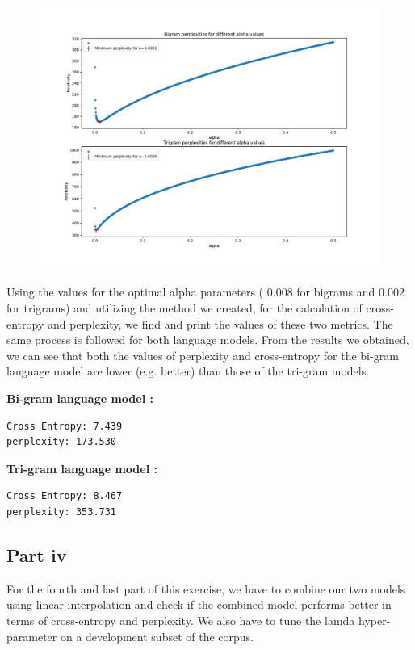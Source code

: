 \documentclass[11pt]{article}
\begin{document}
\begin{figure}[h]
\includegraphics[width=\columnwidth]{Alpha_Tuning.pdf}
\end{figure}

\newpage

Using the values for the optimal alpha parameters ( \textit{$0.008$} for bigrams and \textit{$0.002$} for trigrams) and utilizing the method we created, for the calculation of cross-entropy and perplexity, we find and print the values of these two metrics. The same process is followed for both language models. From the results we obtained, we can see that both the values of perplexity and cross-entropy for the bi-gram language model are lower (e.g. better) than those of the tri-gram models.

\bigskip
\textbf{Bi-gram language model :}
\begin{verbatim}
Cross Entropy: 7.439
perplexity: 173.530
\end{verbatim}

\textbf{Tri-gram language model :}
\begin{verbatim}
Cross Entropy: 8.467
perplexity: 353.731
\end{verbatim}

\subsection*{Part iv} 
For the fourth and last part of this exercise, we have to combine our two models using linear interpolation and check if the combined model performs better in terms of cross-entropy and perplexity. We also have to tune the lamda hyper-parameter on a development subset of the corpus. 
\end{document}
